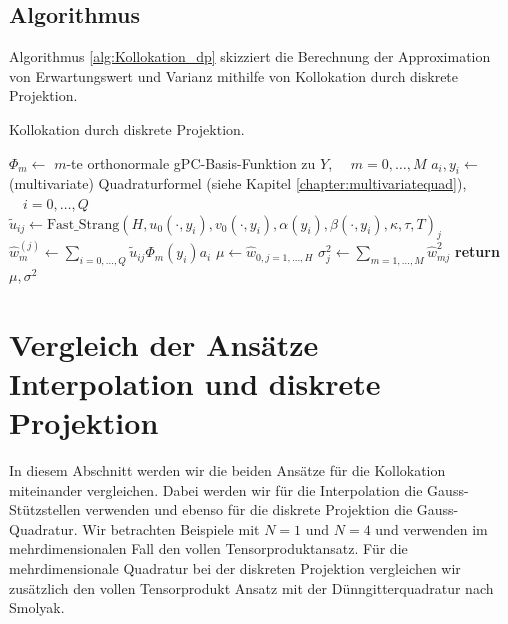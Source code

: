 \subsection{Algorithmus}
Algorithmus \ref{alg:Kollokation_dp} skizziert die Berechnung der Approximation von Erwartungswert und Varianz mithilfe von Kollokation durch diskrete Projektion.
\begin{algorithm}[ht]
    \caption{Kollokation durch diskrete Projektion.}
    \label{alg:Kollokation_dp}
    \begin{algorithmic}[1] %
            \State $\Phi_m\gets$ $m$-te orthonormale gPC-Basis-Funktion zu $Y$, $\quad m=0,\dots,M$
            \State $a_i, y_i\gets$ (multivariate) Quadraturformel (siehe Kapitel \ref{chapter:multivariatequad}), $\quad i=0,\dots,Q$
           		\State $\tilde{u}_{ij}\gets \text{Fast\_Strang}(H,u_0(\cdot, y_i),v_0(\cdot, y_i),\alpha(y_i),\beta(\cdot, y_i),\kappa,\tau,T)_j$
           	\EndFor
            \State $\hat{w}_m^{(j)}\gets \sum_{i=0,\dots,Q}\tilde{u}_{ij}\Phi_m(y_i)a_i$
			\State $\mu\gets \hat{w}_{0,j=1,\dots,H}$ 
			\State $\sigma^2_j\gets \sum_{m=1,\dots,M}\hat{w}^2_{mj}$
			\State \textbf{return} $\mu,\sigma^2$         
        \EndFunction
    \end{algorithmic}
\end{algorithm}
\section{Vergleich der Ansätze Interpolation und diskrete Projektion}
In diesem Abschnitt werden wir die beiden Ansätze für die Kollokation miteinander vergleichen. Dabei werden wir für die Interpolation die Gauss-Stützstellen verwenden und ebenso für die diskrete Projektion die Gauss-Quadratur. Wir betrachten Beispiele mit $N=1$ und $N=4$ und verwenden im mehrdimensionalen Fall den vollen Tensorproduktansatz. Für die mehrdimensionale Quadratur bei der diskreten Projektion vergleichen wir zusätzlich den vollen Tensorprodukt Ansatz mit der Dünngitterquadratur nach Smolyak.
